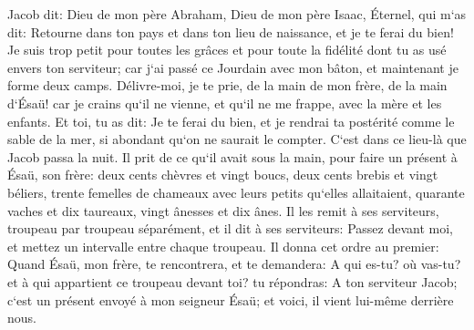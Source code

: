 \verse Jacob dit: Dieu de mon père Abraham, Dieu de mon père Isaac, Éternel, qui m`as dit: Retourne dans ton pays et dans ton lieu de naissance, et je te ferai du bien! 
\verse Je suis trop petit pour toutes les grâces et pour toute la fidélité dont tu as usé envers ton serviteur; car j`ai passé ce Jourdain avec mon bâton, et maintenant je forme deux camps. 
\verse Délivre-moi, je te prie, de la main de mon frère, de la main d`Ésaü! car je crains qu`il ne vienne, et qu`il ne me frappe, avec la mère et les enfants. 
\verse Et toi, tu as dit: Je te ferai du bien, et je rendrai ta postérité comme le sable de la mer, si abondant qu`on ne saurait le compter. 
\verse C`est dans ce lieu-là que Jacob passa la nuit. Il prit de ce qu`il avait sous la main, pour faire un présent à Ésaü, son frère: 
\verse deux cents chèvres et vingt boucs, deux cents brebis et vingt béliers, 
\verse trente femelles de chameaux avec leurs petits qu`elles allaitaient, quarante vaches et dix taureaux, vingt ânesses et dix ânes. 
\verse Il les remit à ses serviteurs, troupeau par troupeau séparément, et il dit à ses serviteurs: Passez devant moi, et mettez un intervalle entre chaque troupeau. 
\verse Il donna cet ordre au premier: Quand Ésaü, mon frère, te rencontrera, et te demandera: A qui es-tu? où vas-tu? et à qui appartient ce troupeau devant toi? 
\verse tu répondras: A ton serviteur Jacob; c`est un présent envoyé à mon seigneur Ésaü; et voici, il vient lui-même derrière nous. 
